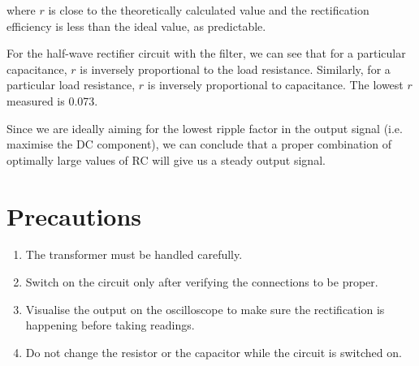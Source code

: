 where $r$ is close to the theoretically calculated value and the rectification efficiency is less than the ideal value, as predictable.

For the half-wave rectifier circuit with the filter, we can see that for a particular capacitance, $r$ is inversely proportional to the load resistance. Similarly, for a particular load resistance, $r$ is inversely proportional to capacitance. The lowest $r$ measured is 0.073.

Since we are ideally aiming for the lowest ripple factor in the output signal (i.e. maximise the DC component), we can conclude that a proper combination of optimally large values of RC will give us a steady output signal.

\section{Precautions}
\begin{enumerate}
    \item The transformer must be handled carefully.
    \item Switch on the circuit only after verifying the connections to be proper.
    \item Visualise the output on the oscilloscope to make sure the rectification is happening before taking readings.
    \item Do not change the resistor or the capacitor while the circuit is switched on.
\end{enumerate}